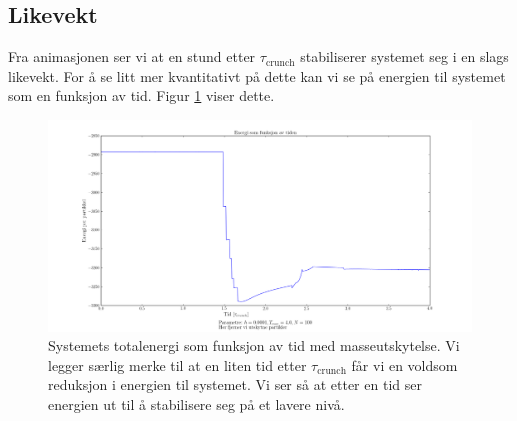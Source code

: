 \documentclass[11pt]{article}
\begin{document}
\begin{multicols}{2}



\subsection{Likevekt}
Fra animasjonen ser vi at en stund etter $\tau_\text{crunch}$
stabiliserer systemet seg i en slags likevekt. For å se litt mer kvantitativt på
dette kan vi se på energien til systemet som en funksjon av tid. Figur
\ref{fig:energi-vs-tid-med-utskytning} viser dette. 

\end{multicols}
\begin{figure}[ht!]
  \centering
  \includegraphics[width=\textwidth]{../fig/energy_plot_with_ejection.png}
  \caption{\label{fig:energi-vs-tid-med-utskytning} Systemets
    totalenergi som funksjon av tid med masseutskytelse. Vi legger
    særlig merke til at en liten tid etter $\tau_\text{crunch}$ får vi
  en voldsom reduksjon i energien til systemet. Vi ser så at etter en
  tid ser energien ut til å stabilisere seg på et lavere nivå.}
\end{figure}
\end{document}
